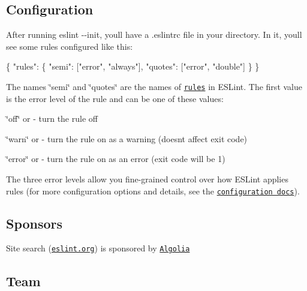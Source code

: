 \subsection*{Configuration}

After running {\ttfamily eslint -\/-\/init}, you\textquotesingle{}ll have a {\ttfamily .eslintrc} file in your directory. In it, you\textquotesingle{}ll see some rules configured like this\+:


\begin{DoxyCode}
\{
    "rules": \{
        "semi": ["error", "always"],
        "quotes": ["error", "double"]
    \}
\}
\end{DoxyCode}


The names {\ttfamily \char`\"{}semi\char`\"{}} and {\ttfamily \char`\"{}quotes\char`\"{}} are the names of \href{http://eslint.org/docs/rules}{\tt rules} in E\+S\+Lint. The first value is the error level of the rule and can be one of these values\+:


\begin{DoxyItemize}
\item {\ttfamily \char`\"{}off\char`\"{}} or {} -\/ turn the rule off
\item {\ttfamily \char`\"{}warn\char`\"{}} or {} -\/ turn the rule on as a warning (doesn\textquotesingle{}t affect exit code)
\item {\ttfamily \char`\"{}error\char`\"{}} or {} -\/ turn the rule on as an error (exit code will be 1)
\end{DoxyItemize}

The three error levels allow you fine-\/grained control over how E\+S\+Lint applies rules (for more configuration options and details, see the \href{http://eslint.org/docs/user-guide/configuring}{\tt configuration docs}).

\subsection*{Sponsors}


\begin{DoxyItemize}
\item Site search (\href{http://eslint.org}{\tt eslint.\+org}) is sponsored by \href{https://www.algolia.com}{\tt Algolia}
\end{DoxyItemize}

\subsection*{Team}

